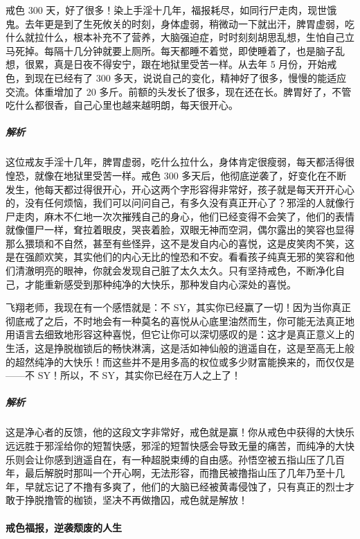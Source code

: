 \begin{case}
    戒色 300 天，好了很多！染上手淫十几年，福报耗尽，如同行尸走肉，现世饿鬼。去年更是到了生死攸关的时刻，身体虚弱，稍微动一下就出汗，脾胃虚弱，吃什么就拉什么，根本补充不了营养，大脑强迫症，时时刻刻胡思乱想，生怕自己立马死掉。每隔十几分钟就要上厕所。每天都睡不着觉，即使睡着了，也是脑子乱想，很累，真是日夜不得安宁，跟在地狱里受苦一样。从去年 5 月份，开始戒色，到现在已经有了 300 多天，说说自己的变化，精神好了很多，慢慢的能适应交流。体重增加了 20 多斤。前额的头发长了很多，现在还在长。脾胃好了，不管吃什么都很香，自己心里也越来越明朗，每天很开心。
    \subparagraph{解析} 这位戒友手淫十几年，脾胃虚弱，吃什么拉什么，身体肯定很瘦弱，每天都活得很惶恐，就像在地狱里受苦一样。戒色 300 多天后，他彻底逆袭了，好变化在不断发生，他每天都过得很开心，开心这两个字形容得非常好，孩子就是每天开开心心的，没有任何烦恼，我们可以问问自己，有多久没有真正开心了？邪淫的人就像行尸走肉，麻木不仁地一次次摧残自己的身心，他们已经变得不会笑了，他们的表情就像僵尸一样，耷拉着眼皮，哭丧着脸，双眼无神而空洞，偶尔露出的笑容也显得那么猥琐和不自然，甚至有些怪异，这不是发自内心的喜悦，这是皮笑肉不笑，这是在强颜欢笑，其实他们的内心无比的惶恐和不安。看看孩子纯真无邪的笑容和他们清澈明亮的眼神，你就会发现自己脏了太久太久。只有坚持戒色，不断净化自己，才能重新感受到那种纯净的大快乐，那种发自内心深处的喜悦。
\end{case}

\begin{case}
    飞翔老师，我现在有一个感悟就是：不 SY，其实你已经赢了一切！因为当你真正彻底戒了之后，不时地会有一种莫名的喜悦从心底里油然而生，你可能无法真正地用语言去细致地形容这种喜悦，但它让你可以深切感叹的是：这才是真正意义上的生活，这是挣脱枷锁后的畅快淋漓，这是活如神仙般的逍遥自在，这是至高无上般的超然纯净的大快乐！而这些并不是用多高的权位或多少财富能换来的，而仅仅是——不 SY！所以，不 SY，其实你已经在万人之上了！
    \subparagraph{解析} 这是净心者的反馈，他的这段文字非常好，戒色就是赢！你从戒色中获得的大快乐远远胜于邪淫给你的短暂快感，邪淫的短暂快感会导致无量的痛苦，而纯净的大快乐则会让你感到逍遥自在，有一种超脱束缚的自由感。孙悟空被五指山压了几百年，最后解脱时那叫一个开心啊，无法形容，而撸民被撸指山压了几年乃至十几年，早就忘记了不撸有多爽了，他们的大脑已经被黄毒侵蚀了，只有真正的烈士才敢于挣脱撸管的枷锁，坚决不再做撸囚，戒色就是解放！
\end{case}

\paragraph{戒色福报，逆袭颓废的人生}


